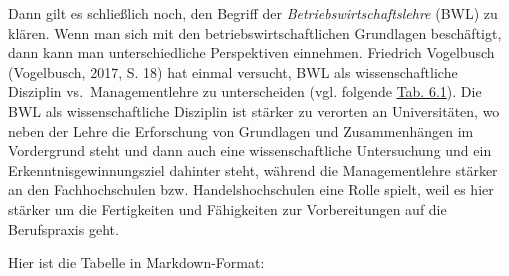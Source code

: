 \documentclass[
  letterpaper,
]{book}
\begin{document}
Dann gilt es schließlich noch, den Begriff der
\emph{Betriebswirtschaftslehre} (BWL) zu klären. Wenn man sich mit den
betriebswirtschaftlichen Grundlagen beschäftigt, dann kann man
unterschiedliche Perspektiven einnehmen. Friedrich Vogelbusch
(Vogelbusch, 2017, S. 18) hat einmal versucht, BWL als wissenschaftliche
Disziplin vs.~Managementlehre zu unterscheiden (vgl. folgende
\hyperref[table61]{Tab. 6.1}). Die BWL als wissenschaftliche Disziplin
ist stärker zu verorten an Universitäten, wo neben der Lehre die
Erforschung von Grundlagen und Zusammenhängen im Vordergrund steht und
dann auch eine wissenschaftliche Untersuchung und ein
Erkenntnisgewinnungsziel dahinter steht, während die Managementlehre
stärker an den Fachhochschulen bzw. Handelshochschulen eine Rolle
spielt, weil es hier stärker um die Fertigkeiten und Fähigkeiten zur
Vorbereitungen auf die Berufspraxis geht.

Hier ist die Tabelle in Markdown-Format:
\end{document}
